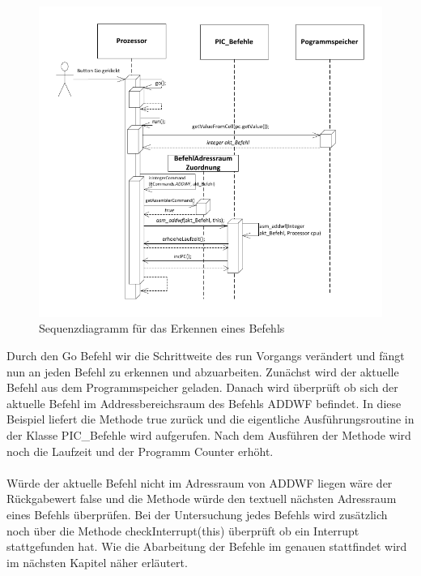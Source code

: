 \begin{figure}[h]
\centering
\includegraphics[scale=0.9]{Bilder/SeqBef.pdf}
\caption{Sequenzdiagramm f\"ur das Erkennen eines Befehls}
\end{figure}
\newpage
\noindent Durch den Go Befehl wir die Schrittweite des run Vorgangs ver\"andert und f\"angt nun an jeden Befehl zu erkennen und abzuarbeiten. Zun\"achst wird der aktuelle Befehl aus dem Programmspeicher geladen. Danach wird \"uberpr\"uft ob sich der aktuelle Befehl im Addressbereichsraum des Befehls ADDWF befindet.
In diese Beispiel liefert die Methode true zur\"uck und die eigentliche Ausf\"uhrungsroutine in der Klasse PIC\_Befehle wird aufgerufen. Nach dem Ausf\"uhren der Methode wird noch die Laufzeit und der Programm Counter erh\"oht.
\\
\\\noindent W\"urde der aktuelle Befehl nicht im Adressraum von ADDWF liegen w\"are der R\"uckgabewert false und die Methode w\"urde den textuell n\"achsten Adressraum eines Befehls \"uberpr\"ufen. Bei der Untersuchung jedes Befehls wird zus\"atzlich noch \"uber die Methode checkInterrupt(this) \"uberpr\"uft ob ein Interrupt stattgefunden hat.
 Wie die Abarbeitung der Befehle im genauen stattfindet wird im n\"achsten Kapitel n\"aher erl\"autert.
